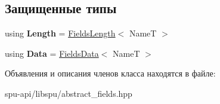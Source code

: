 \subsection*{Защищенные типы}
\begin{DoxyCompactItemize}
\item 
\mbox{\label{class_s_p_u_1_1_abstract_fields_ac586104835d088869e6c66a00f52fb71}} 
using {\bfseries Length} = \hyperlink{class_s_p_u_1_1_fields_length}{Fields\+Length}$<$ NameT $>$
\item 
\mbox{\label{class_s_p_u_1_1_abstract_fields_acf6cee1ea5388266f017e277dbaf78ef}} 
using {\bfseries Data} = \hyperlink{class_s_p_u_1_1_fields_data}{Fields\+Data}$<$ NameT $>$
\end{DoxyCompactItemize}


Объявления и описания членов класса находятся в файле\+:\begin{DoxyCompactItemize}
\item 
spu-\/api/libspu/abstract\+\_\+fields.\+hpp\end{DoxyCompactItemize}
